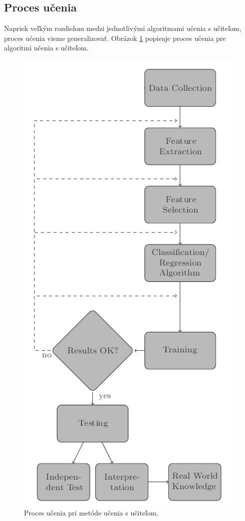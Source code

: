 \subsection{Proces učenia}
Napriek veľkým rozdielom medzi jednotlivými algoritmami učenia s učiteľom, proces učenia vieme generalizovať. Obrázok \ref{img:super_process} popisuje proces učenia pre algoritmi učenia s učiteľom.\par
\begin{figure}[H]
	\begin{center}
		\includegraphics[scale=0.5]{img/supervised_process.png}
		\caption{Proces učenia pri metóde učenia s učiteľom.}
		\label{img:super_process}
	\end{center}
\end{figure}
